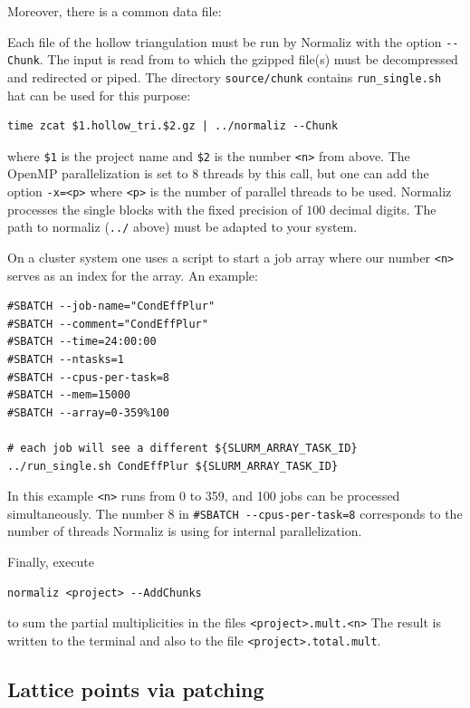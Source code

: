 Moreover, there is a common data file:
\begin{itemize}
\end{itemize}

Each file of the hollow triangulation must be run by  Normaliz with the option \verb|--Chunk|. The input is read from  to which the gzipped file(s) must be decompressed and redirected or piped. The directory \verb|source/chunk| contains \verb|run_single.sh| hat can be used for this purpose:
\begin{Verbatim}
time zcat $1.hollow_tri.$2.gz | ../normaliz --Chunk 
\end{Verbatim}
where \verb|$1| is the project name and \verb|$2| is the number \verb|<n>| from above. The OpenMP parallelization is set to $8$ threads by this call, but one can add the option \verb|-x=<p>| where \verb|<p>| is the number of parallel threads to be used. Normaliz processes the single blocks with the fixed precision of $100$ decimal digits. The path to normaliz (\verb|../| above) must be adapted to your system.

On a cluster system one uses a script to start a job array where our number \verb|<n>| serves as an index for the array. An example:
\begin{Verbatim}
#SBATCH --job-name="CondEffPlur"
#SBATCH --comment="CondEffPlur"
#SBATCH --time=24:00:00
#SBATCH --ntasks=1
#SBATCH --cpus-per-task=8
#SBATCH --mem=15000
#SBATCH --array=0-359%100

# each job will see a different ${SLURM_ARRAY_TASK_ID}
../run_single.sh CondEffPlur ${SLURM_ARRAY_TASK_ID}
\end{Verbatim}
In this example \verb|<n>| runs from 0 to 359, and 100 jobs can be processed simultaneously. The number $8$ in \verb|#SBATCH --cpus-per-task=8| corresponds to the number of threads Normaliz is using for internal parallelization. 

Finally, execute 
\begin{Verbatim}
normaliz <project> --AddChunks
\end{Verbatim}
to sum the partial multiplicities in the files \verb|<project>.mult.<n>| The result is written to the terminal and also to the file \verb|<project>.total.mult|.

\subsection{Lattice points via patching}\label{DistPatch}

